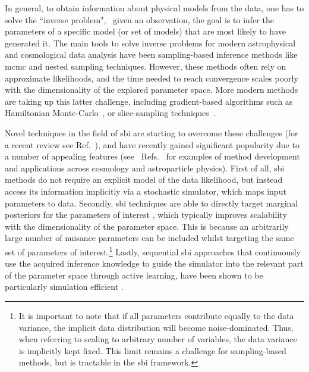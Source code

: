 In general, to obtain information about physical models from the data, one has to solve the ``inverse problem", \ie~given an observation, the goal is to infer the parameters of a specific model (or set of models) that are most likely to have generated it. The main tools to solve inverse problems for modern astrophysical and cosmological data analysis have been sampling-based inference methods like \gls*{mcmc} \cite{Metropolis:1953am, Hastings:1970aa} and nested sampling \cite{Skilling:2006gxv, Feroz:2008xx, Handley:2015fda} techniques. However, these methods often rely on approximate likelihoods, and the time needed to reach convergence scales poorly with the dimensionality of the explored parameter space. More modern methods are taking up this latter challenge, including gradient-based algorithms such as Hamiltonian Monte-Carlo~\cite{Duane:1987de}, or slice-sampling techniques~\cite{Neal:aa, Handley:2015fda}.

Novel techniques in the field of \gls*{sbi} are starting to overcome these challenges (for a recent review see Ref.~\cite{Cranmer:2019eaq}), and have recently gained significant popularity due to a number of appealing features (see \eg~Refs.~\cite{Alsing:2018eau, Alsing:2019xrx, Lemos:2022kua, Dax:2021tsq, Wagner-Carena:2020yun, Coogan:2022cky, Legin:2022ovl, Alvey:2023pkx, Bhardwaj:2023xph, Karchev:2022xyn, Brehmer:2019jyt, Zhao:2022ren,Cole:2021gwr} for examples of method development and applications across cosmology and astroparticle physics). First of all, \gls*{sbi} methods do not require an explicit model of the data likelihood, but instead access its information implicitly via a stochastic simulator, which maps input parameters to data. Secondly, \gls*{sbi} techniques are able to directly target marginal posteriors for the parameters of interest \cite{Alsing:2019xrx, Jeffrey:2020itg}, which typically improves scalability with the dimensionality of the parameter space. This is because an arbitrarily large number of nuisance parameters can be included whilst targeting the same set of parameters of interest.\footnote{It is important to note that if all parameters contribute equally to the data variance, the implicit data distribution will become noise-dominated. Thus, when referring to scaling to arbitrary number of variables, the data variance is implicitly kept fixed. This limit remains a challenge for sampling-based methods, but is tractable in the \gls*{sbi} framework.} Lastly, sequential \gls*{sbi} approaches that continuously use the acquired inference knowledge to guide the simulator into the relevant part of the parameter space through active learning, have been shown to be particularly simulation efficient \cite{Lueckmann:2021aa}.

